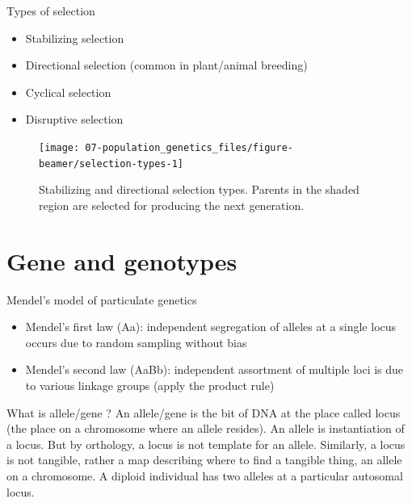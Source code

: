 \documentclass[11pt,dvipsnames,ignorenonframetext,aspectratio=169]{beamer}
\providecommand{\tightlist}{%
  \setlength{\itemsep}{0pt}\setlength{\parskip}{0pt}}
\begin{document}
\begin{frame}{Types of selection}
\protect\hypertarget{types-of-selection}{}
\begin{itemize}
\tightlist
\item
  Stabilizing selection
\item
  Directional selection (common in plant/animal breeding)
\item
  Cyclical selection
\item
  Disruptive selection
\end{itemize}

\begin{figure}
\texttt{[image: 07-population\_genetics\_files/figure-beamer/selection-types-1]} \caption{Stabilizing and directional selection types. Parents in the shaded region are selected for producing the next generation.}\label{fig:selection-types}
\end{figure}
\end{frame}

\hypertarget{gene-and-genotypes}{%
\section{Gene and genotypes}\label{gene-and-genotypes}}

\begin{frame}{Mendel's model of particulate genetics}
\protect\hypertarget{mendels-model-of-particulate-genetics}{}
\begin{itemize}
\tightlist
\item
  Mendel's first law (Aa): independent segregation of alleles at a
  single locus occurs due to random sampling without bias
\end{itemize}

\begin{itemize}
\tightlist
\item
  Mendel's second law (AaBb): independent assortment of multiple loci is
  due to various linkage groups (apply the product rule)
\end{itemize}
\end{frame}

\begin{frame}{What is allele/gene ?}
\protect\hypertarget{what-is-allelegene}{}
An allele/gene is the bit of DNA at the place called locus (the place on
a chromosome where an allele resides). An allele is instantiation of a
locus. But by orthology, a locus is not template for an allele.
Similarly, a locus is not tangible, rather a map describing where to
find a tangible thing, an allele on a chromosome. A diploid individual
has two alleles at a particular autosomal locus.
\end{frame}
\end{document}
